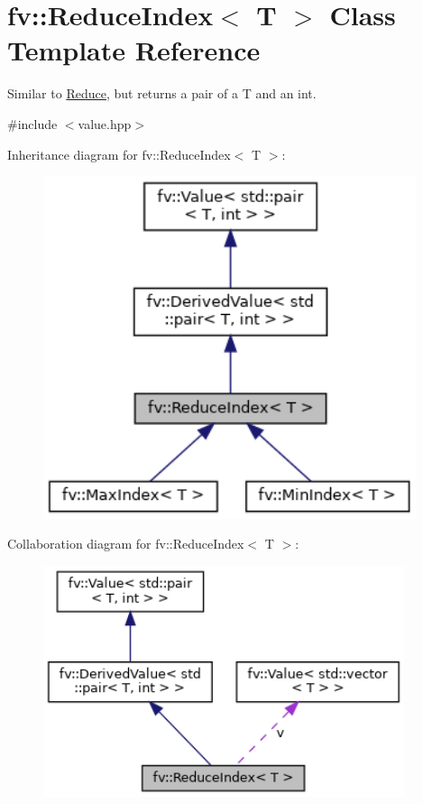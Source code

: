 \hypertarget{classfv_1_1ReduceIndex}{}\section{fv\+:\+:Reduce\+Index$<$ T $>$ Class Template Reference}
\label{classfv_1_1ReduceIndex}


Similar to \hyperlink{classfv_1_1Reduce}{Reduce}, but returns a pair of a T and an int.  




{\ttfamily \#include $<$value.\+hpp$>$}



Inheritance diagram for fv\+:\+:Reduce\+Index$<$ T $>$\+:
\nopagebreak
\begin{figure}[H]
\begin{center}
\leavevmode
\includegraphics[width=310pt]{classfv_1_1ReduceIndex__inherit__graph}
\end{center}
\end{figure}


Collaboration diagram for fv\+:\+:Reduce\+Index$<$ T $>$\+:
\nopagebreak
\begin{figure}[H]
\begin{center}
\leavevmode
\includegraphics[width=300pt]{classfv_1_1ReduceIndex__coll__graph}
\end{center}
\end{figure}

